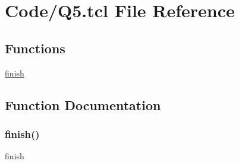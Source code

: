 \hypertarget{Q5_8tcl}{}\section{Code/\+Q5.tcl File Reference}
\label{Q5_8tcl}
\subsection*{Functions}
\begin{DoxyCompactItemize}
\item 
\mbox{\hyperlink{Q5_8tcl_a30728837c246b65ef76298af0101d99c}{finish}}
\end{DoxyCompactItemize}


\subsection{Function Documentation}
\mbox{\label{Q5_8tcl_a30728837c246b65ef76298af0101d99c}} 
\subsubsection{\texorpdfstring{finish()}{finish()}}
{\footnotesize\ttfamily finish}

